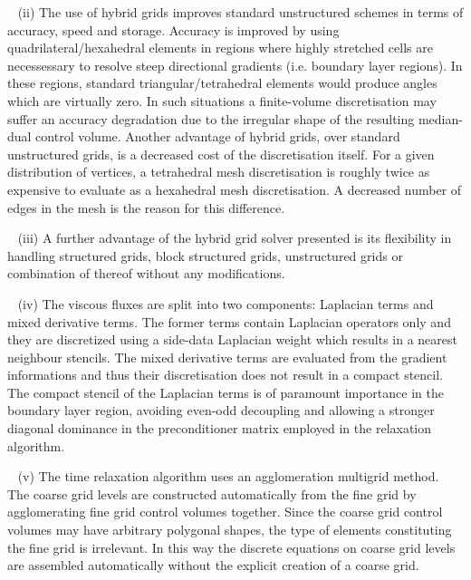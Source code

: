 ~\newline
 (ii)
 The use of hybrid grids improves standard unstructured schemes in terms of
 accuracy, speed and storage. Accuracy is improved by using quadrilateral/hexahedral
 elements in regions where highly stretched cells are necessessary to resolve
 steep directional gradients (i.e. boundary layer regions). In these regions, standard
 triangular/tetrahedral elements would produce angles which are virtually zero.
 In such situations a finite-volume discretisation may suffer an accuracy degradation
 due to the irregular shape of the resulting median-dual control volume.
 Another advantage of hybrid grids, over standard unstructured grids,
 is a decreased cost of the discretisation itself. For a given distribution of
 vertices, a tetrahedral mesh discretisation is roughly twice as expensive to
 evaluate as a hexahedral mesh discretisation. A decreased number of edges in the mesh
 is the reason for this difference.
 
~\newline
 (iii)
 A further advantage of the hybrid grid solver presented is its
 flexibility in handling structured grids, block structured grids, unstructured
 grids or combination of thereof without any modifications.

~\newline
 (iv)
 The viscous fluxes are split into two components: Laplacian terms and
 mixed derivative terms. The former terms contain Laplacian operators
 only and they are discretized using a side-data Laplacian weight which
 results in a nearest neighbour stencils. The mixed derivative terms
 are evaluated from the gradient informations and thus their discretisation
 does not result in a compact stencil.
 The compact stencil of the Laplacian terms is of paramount importance in
 the boundary layer region, avoiding even-odd decoupling and allowing
 a stronger diagonal dominance in the preconditioner matrix employed in the
 relaxation algorithm.

~\newline
 (v)
 The time relaxation algorithm uses an agglomeration multigrid method.
 The coarse grid levels are constructed
 automatically from the fine grid by agglomerating fine grid control
 volumes together. Since the coarse grid control volumes may have arbitrary
 polygonal shapes, the type of elements constituting the fine grid is
 irrelevant. In this way the discrete equations on coarse grid levels
 are assembled automatically without the explicit creation of a coarse grid.

